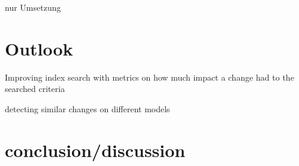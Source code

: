 \par nur Umsetzung\section{Outlook}

\par Improving index search with metrics on how much impact a change had to the searched criteria
\par detecting similar changes on different models\section{conclusion/discussion}
